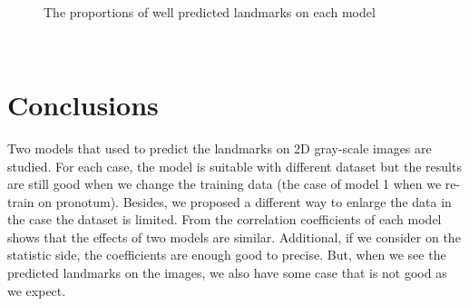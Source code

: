 \documentclass[12pt,a4paper]{article}
\begin{document}
\begin{figure}[h!]
\centering
{}~~
\caption{The proportions of well predicted landmarks on each model}
\label{expr22s}
\end{figure}~\\
\section{Conclusions}
Two models that used to predict the landmarks on 2D gray-scale images are studied. For each case, the model is suitable with different dataset but the results are still good when we change the training data (the case of model 1 when we re-train on pronotum). Besides, we proposed a different way to enlarge the data in the case the dataset is limited. From the correlation coefficients of each model shows that the effects of two models are similar. Additional, if we consider on the statistic side, the coefficients are enough good to precise. But, when we see the predicted landmarks on the images, we also have some case that is not good as we expect. 


\pagebreak
\appendix
\end{document}
